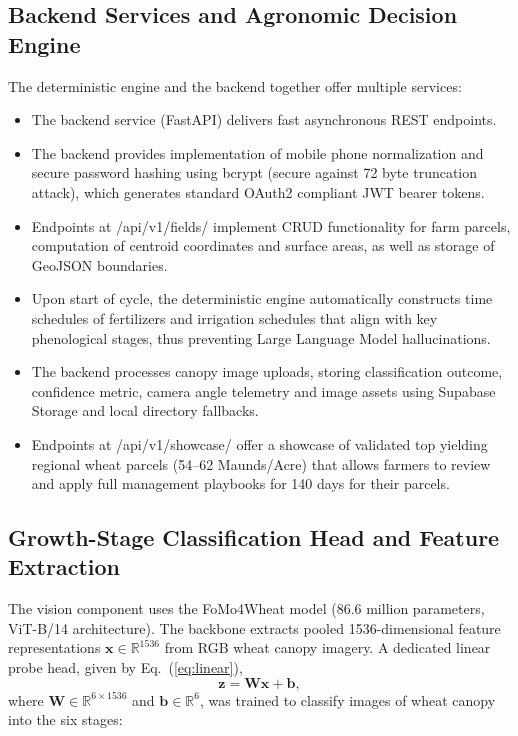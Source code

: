 \documentclass{FastFyp}
\begin{document}
\subsection{Backend Services and Agronomic Decision Engine}
The  deterministic engine and the backend together offer multiple services:
\begin{itemize}

\item The backend service (FastAPI) delivers fast asynchronous REST endpoints.

\item The backend provides implementation of mobile phone normalization and secure password hashing using bcrypt (secure against 72 byte truncation attack), which generates standard OAuth2 compliant JWT bearer tokens.

 \item Endpoints at /api/v1/fields/ implement CRUD functionality for farm parcels, computation of centroid coordinates and surface areas, as well as storage of GeoJSON boundaries.

\item Upon start of cycle, the deterministic engine automatically constructs time schedules of fertilizers and irrigation schedules that align with key phenological stages, thus preventing Large Language Model hallucinations.

\item The backend processes canopy image uploads, storing classification outcome, confidence metric, camera angle telemetry and image assets using Supabase Storage and local directory fallbacks.

\item Endpoints at /api/v1/showcase/ offer a showcase of validated top yielding regional wheat parcels (54--62 Maunds/Acre) that allows farmers to review and apply full management playbooks for 140 days for their parcels.
\end{itemize}

\subsection{Growth-Stage Classification Head and Feature Extraction}

The vision component uses the FoMo4Wheat model (86.6 million parameters, ViT-B/14 architecture). The backbone extracts pooled 1536-dimensional feature representations $\mathbf{x} \in \mathbb{R}^{1536}$ from RGB wheat canopy imagery. A dedicated linear probe head, given by Eq.~(\ref{eq:linear}),
\begin{equation}\label{eq:linear}
    \mathbf{z} = \mathbf{W}\mathbf{x} + \mathbf{b},
\end{equation}
where $\mathbf{W} \in \mathbb{R}^{6 \times 1536}$ and $\mathbf{b} \in \mathbb{R}^{6}$, was trained to classify images of wheat canopy into the six stages:
\end{document}
